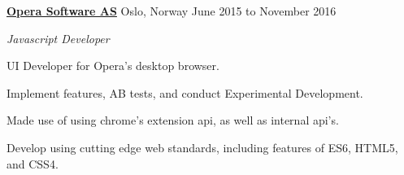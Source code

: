 \documentclass[11pt]{article}
\newenvironment{outerlist}[1][\enskip\textbullet]%
        {\begin{itemize}[#1]}{\end{itemize}%
         \vspace{-.6\baselineskip}}
\newenvironment{innerlist}[1][\enskip\textbullet]%
        {\begin{compactitem}[#1]}{\end{compactitem}}
\newcommand{\blankline}{\quad\pagebreak[2]}
\begin{document}
\href{https://www.opera.com/}{\textbf{Opera Software AS}}
Oslo, Norway
\hfill June 2015 to November 2016
\begin{outerlist}
\item[] \textit{Javascript Developer}
  \begin{innerlist}
      \footnotesize
    \item UI Developer for Opera's desktop browser.
      \begin{innerlist}
        \item Implement features, AB tests, and conduct Experimental Development.
        \item Made use of using chrome's extension api, as well as internal api's.
        \item Develop using cutting edge web standards,
          including features of ES6, HTML5, and CSS4.
      \end{innerlist}
  \end{innerlist}
\end{outerlist}
\blankline
\end{document}
